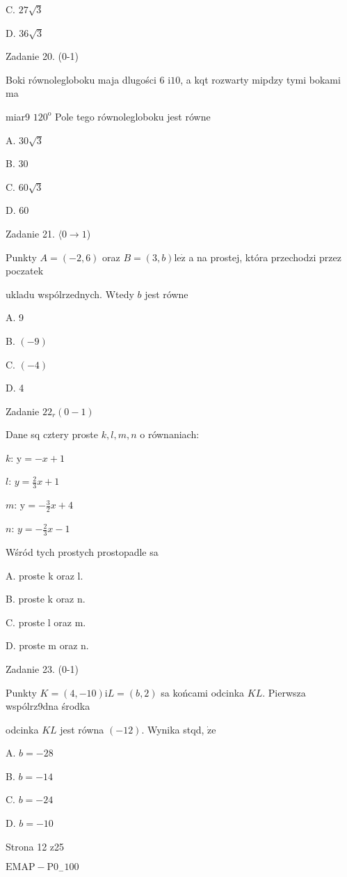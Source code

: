 \documentclass[a4paper,12pt]{article}
\begin{document}
C. $27\sqrt{3}$

D. $36\sqrt{3}$

Zadanie 20. (0-1)

Boki równolegloboku maja dlugości 6 $\mathrm{i} 10$, a kqt rozwarty mipdzy tymi bokami ma

miar9 $120^{\mathrm{o}}$ Pole tego równolegloboku jest równe

A. $30\sqrt{3}$

B. 30

C. $60\sqrt{3}$

D. 60

Zadanie 21. $\langle 0\rightarrow 1$)

Punkty $A=(-2,6)$ oraz $B=(3,b) \mathrm{l}\mathrm{e}\dot{\mathrm{z}}$ a na prostej, która przechodzi przez poczatek

ukladu wspólrzednych. Wtedy $b$ jest równe

A. 9

B. $(-9)$

C. $(-4)$

D. 4

Zadanie $22_{r}(0-1)$

Dane sq cztery proste $k, l, m, n$ o równaniach:

$k$: $\mathrm{y}=-x+1$

$l$: $y=\displaystyle \frac{2}{3}x+1$

$m$: $\displaystyle \mathrm{y}=-\frac{3}{2}x+4$

$n$: $y=-\displaystyle \frac{2}{3}x-1$

Wśród tych prostych prostopadle sa

A. proste k oraz l.

B. proste k oraz n.

C. proste l oraz m.

D. proste m oraz n.

Zadanie 23. (0-1)

Punkty $K=(4,-10) \mathrm{i} L=(b,2)$ sa końcami odcinka $KL$. Pierwsza wspólrz9dna środka

odcinka $KL$ jest równa $(-12)$. Wynika stqd, $\dot{\mathrm{z}}\mathrm{e}$

A. $b=-28$

B. $b=-14$

C. $b=-24$

D. $b=-10$

Strona 12 z25

$\mathrm{E}\mathrm{M}\mathrm{A}\mathrm{P}-\mathrm{P}0_{-}100$
\end{document}
